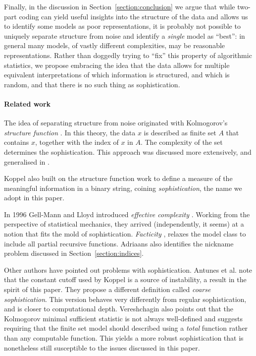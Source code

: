 \documentclass{style/llncs}
\begin{document}
Finally, in the discussion in Section~\ref{section:conclusion} we argue that while two-part coding can yield useful insights into the structure of the data and allows us to identify some models as poor representations, it is probably not possible to uniquely separate structure from noise and identify a \emph{single} model as ``best'': in general many models, of vastly different complexities, may be reasonable representations. Rather than doggedly trying to ``fix'' this property of algorithmic statistics, we propose embracing the idea that the data allows for multiple equivalent interpretations of which information is structured, and which is random, and that there is no such thing as sophistication.

\paragraph{Related work}
The idea of separating structure from noise originated with Kolmogorov's \emph{structure function} \cite{cover1985kolmogorov}. In this theory, the data $x$ is described as finite set $A$ that contains $x$, together with the index of $x$ in $A$. The complexity of the set determines the sophistication. This approach was discussed more extensively, and generalised in \cite{vereshchagin2004kolmogorov,gacs2001algorithmic}. 

Koppel \cite{koppelSoph1988,koppel1991almost} also built on the structure function work to define a measure of the meaningful information in a binary string, coining \emph{sophistication}, the name we adopt in this paper. 

In 1996 Gell-Mann and Lloyd introduced \emph{effective complexity} \cite{gellmann1996information}. Working from the perspective of statistical mechanics, they arrived (independently, it seems) at a notion that fits the mold of sophistication. \emph{Facticity} \cite{adriaans2012facticity}, relaxes the model class to include all partial recursive functions. Adriaans also identifies the nickname problem discussed in Section~\ref{section:indices}.

Other authors have pointed out problems with sophistication. Antunes et al. \cite{antunes2009sophistication} note that the constant cutoff used by Koppel is a source of instability, a result in the spirit of this paper. They propose a different definition called \emph{coarse sophistication}. This version behaves very differently from regular sophistication, and is closer to computational depth. Vereshchagin \cite{vereshchagin2013algorithmic} also points out that the Kolmogorov minimal sufficient statistic is not always well-defined and suggests requiring that the finite set model should described using a \emph{total} function rather than any computable function. This yields a more robust sophistication that is nonetheless still susceptible to the issues discussed in this paper.
\end{document}
